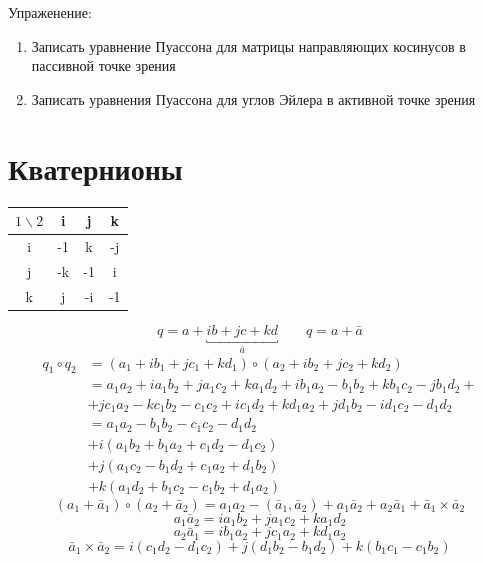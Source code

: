 \documentclass[crop=false]{standalone}
\begin{document}
\noindent \keypoint Упраженение:
\begin{enumerate}
    \item 
    Записать уравнение Пуассона для матрицы направляющих косинусов в пассивной точке зрения
    \item
    Записать уравнения Пуассона для углов Эйлера в активной точке зрения
\end{enumerate}
\section{Кватернионы}
\TwoCols{ %
\[-1 = i^2 = j^2 = k^2 = i \circ j \circ k\]
\[\boxed{q = a + i b + j c + k d}\]
}
{
    \centering
    \begin{tabular}{c|c|c|c}
        $1\backslash 2$  & i  & j   & k \\
          \hline
        i & -1 &  k  & -j \\
        \hline
        j & -k & -1  & i \\
        \hline
        k & j &  -i & -1
    \end{tabular}
}
\[q = a + \underbracket{i b + j c + k d}_{\bar a} \qquad q= a + \bar a\]
\[
\begin{aligned}
q_1 \circ q_2 &= (a_1 + i b_1 + j c_1 + k d_1) \circ (a_2 + i b_2 + j c_2 + k d_2) \\ 
&= a_1 a_2 + i a_1 b_2 + j a_1 c_2 + k a_1 d_2 + i b_1 a_2 - b_1 b_2 + k b_1 c_2 - j b_1 d_2 + \\
&+ j c_1 a_2 - k c_1 b_2 - c_1 c_2 + i c_1 d_2 + k d_1 a_2 + j d_1 b_2 - i d_1 c_2 - d_1 d_2 \\
&=
a_1 a_2 - b_1 b_2 -c_1 c_2 -d_1 d_2 \\
&+ i \left( a_1 b_2 + b_1 a_2 + c_1 d_2 - d_1 c_2\right) \\
&+ j \left(a_1 c_2 - b_1 d_2 + c_1 a_2 + d_1 b_2\right) \\ 
&+ k \left(a_1 d_2 + b_1 c_2 - c_1 b_2 + d_1 a_2 \right)
\end{aligned}
\]
\[\left( a_1 + \bar a_1\right) \circ \left(a_2 + \bar a_2\right) = a_1 a_2 - (\bar a_1 ,\bar a_2) + a_1 \bar a_2 + a_2 \bar a_1 + \bar a_1 \times \bar a_2 \]
\[a_1 \bar a_2 = i a_1 b_2 + j a_1 c_2 + k a_1 d_2 \]
\[a_2 \bar a_1 = i b_1 a_2 + j c_1 a_2 + k d_1 a_2 \]
\[\bar a_1 \times \bar a_2 = i (c_1 d_2 - d_1 c_2) + j (d_1 b_2 - b_1 d_2) + k (b_1 c_1 - c_1 b_2 )\]
\end{document}
